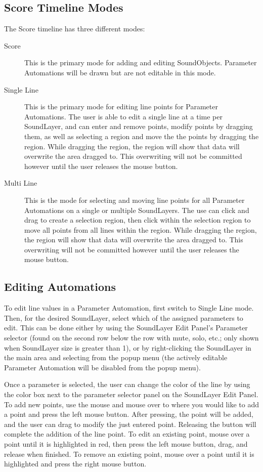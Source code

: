 \subsection{Score Timeline Modes}

The Score timeline has three different modes:

\begin{description}
\item[Score]
This is the primary mode for adding and editing SoundObjects. Parameter
Automations will be drawn but are not editable in this mode.
\item[Single Line]
This is the primary mode for editing line points for Parameter
Automations. The user is able to edit a single line at a time per
SoundLayer, and can enter and remove points, modify points by dragging
them, as well as selecting a region and move the the points by dragging
the region. While dragging the region, the region will show that data
will overwrite the area dragged to. This overwriting will not be
committed however until the user releases the mouse button.
\item[Multi Line]
This is the mode for selecting and moving line points for all Parameter
Automations on a single or multiple SoundLayers. The use can click and
drag to create a selection region, then click within the selection
region to move all points from all lines within the region. While
dragging the region, the region will show that data will overwrite the
area dragged to. This overwriting will not be committed however until
the user releases the mouse button.
\end{description}

\subsection{Editing Automations}

To edit line values in a Parameter Automation, first switch to Single
Line mode. Then, for the desired SoundLayer, select which of the
assigned parameters to edit. This can be done either by using the
SoundLayer Edit Panel's Parameter selector (found on the second row
below the row with mute, solo, etc.; only shown when SoundLayer size is
greater than 1), or by right-clicking the SoundLayer in the main area
and selecting from the popup menu (the actively editable Parameter
Automation will be disabled from the popup menu).

Once a parameter is selected, the user can change the color of the line
by using the color box next to the parameter selector panel on the
SoundLayer Edit Panel. To add new points, use the mouse and mouse over
to where you would like to add a point and press the left mouse button.
After pressing, the point will be added, and the user can drag to modify
the just entered point. Releasing the button will complete the addition
of the line point. To edit an existing point, mouse over a point until
it is highlighted in red, then press the left mouse button, drag, and
release when finished. To remove an existing point, mouse over a point
until it is highlighted and press the right mouse button.


